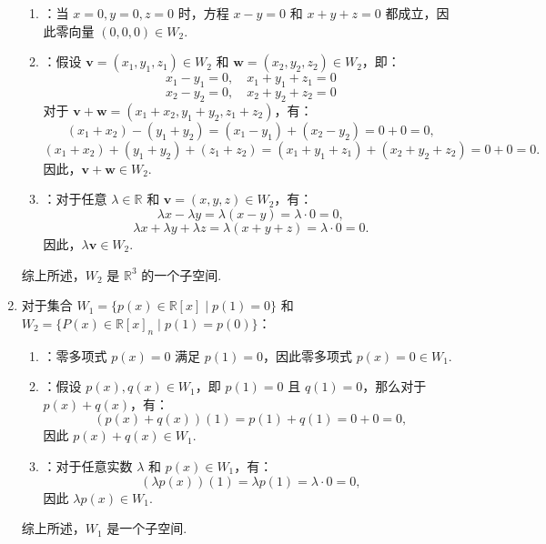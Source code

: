 \begin{exercise}
\begin{exgroup}
\begin{answer}
\begin{enumerate}
                \begin{enumerate}
                    \item {}：当 $x = 0, y = 0, z = 0$ 时，方程 $x - y = 0$ 和 $x + y + z = 0$ 都成立，因此零向量 $(0, 0, 0) \in W_2$.
                    \item {}：假设 $\mathbf{v} = (x_1, y_1, z_1) \in W_2$ 和 $\mathbf{w} = (x_2, y_2, z_2) \in W_2$，即：
                    \[
                    x_1 - y_1 = 0, \quad x_1 + y_1 + z_1 = 0
                    \]
                    \[
                    x_2 - y_2 = 0, \quad x_2 + y_2 + z_2 = 0
                    \]
                    对于 $\mathbf{v} + \mathbf{w} = (x_1 + x_2, y_1 + y_2, z_1 + z_2)$，有：
                    \[
                    (x_1 + x_2) - (y_1 + y_2) = (x_1 - y_1) + (x_2 - y_2) = 0 + 0 = 0,
                    \]
                    \[
                    (x_1 + x_2) + (y_1 + y_2) + (z_1 + z_2) = (x_1 + y_1 + z_1) + (x_2 + y_2 + z_2) = 0 + 0 = 0.
                    \]
                    因此，$\mathbf{v} + \mathbf{w} \in W_2$.
                    \item {}：对于任意 $\lambda \in \mathbb{R}$ 和 $\mathbf{v} = (x, y, z) \in W_2$，有：
                    \[
                    \lambda x - \lambda y = \lambda (x - y) = \lambda \cdot 0 = 0,
                    \]
                    \[
                    \lambda x + \lambda y + \lambda z = \lambda (x + y + z) = \lambda \cdot 0 = 0.
                    \]
                    因此，$\lambda \mathbf{v} \in W_2$.
                \end{enumerate}
                综上所述，$W_2$ 是 $\mathbb{R}^3$ 的一个子空间.

                \item 对于集合 $W_1 = \{p(x) \in \mathbb{R}[x] \mid p(1) = 0\}$ 和 $W_2 = \{P(x) \in \mathbb{R}[x]_n \mid p(1) = p(0)\}$：

                \begin{enumerate}
                    \item {}：零多项式 $p(x) = 0$ 满足 $p(1) = 0$，因此零多项式 $p(x) = 0 \in W_1$.
                    \item {}：假设 $p(x), q(x) \in W_1$，即 $p(1) = 0$ 且 $q(1) = 0$，那么对于 $p(x) + q(x)$，有：
                    \[
                    (p(x) + q(x))(1) = p(1) + q(1) = 0 + 0 = 0,
                    \]
                    因此 $p(x) + q(x) \in W_1$.
                    \item {}：对于任意实数 $\lambda$ 和 $p(x) \in W_1$，有：
                    \[
                    (\lambda p(x))(1) = \lambda p(1) = \lambda \cdot 0 = 0,
                    \]
                    因此 $\lambda p(x) \in W_1$.
                \end{enumerate}
                综上所述，$W_1$ 是一个子空间.


\end{enumerate}
\end{answer}
\end{exgroup}
\end{exercise}
